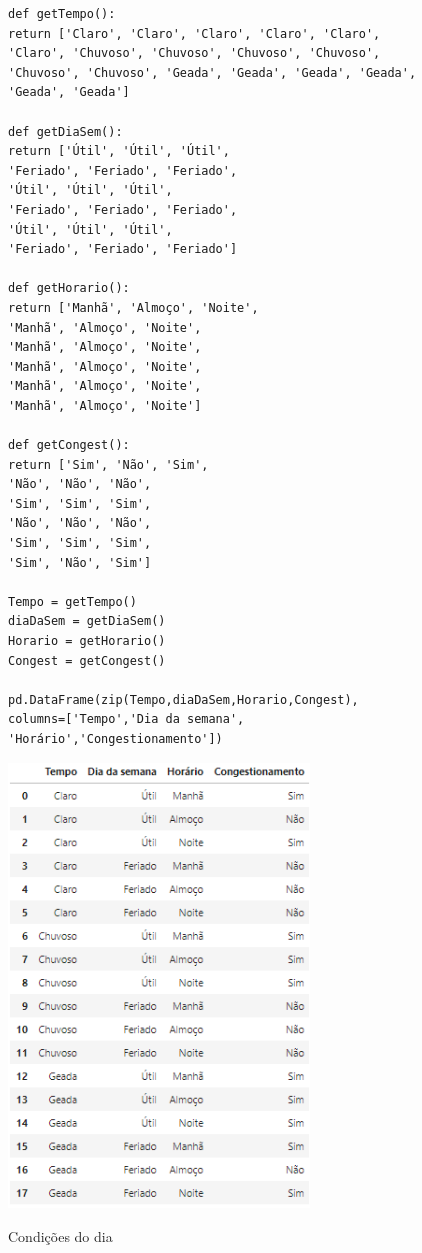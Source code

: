 \begin{verbatim}
def getTempo():
return ['Claro', 'Claro', 'Claro', 'Claro', 'Claro', 
'Claro', 'Chuvoso', 'Chuvoso', 'Chuvoso', 'Chuvoso', 
'Chuvoso', 'Chuvoso', 'Geada', 'Geada', 'Geada', 'Geada', 
'Geada', 'Geada']

def getDiaSem():
return ['Útil', 'Útil', 'Útil',
'Feriado', 'Feriado', 'Feriado',
'Útil', 'Útil', 'Útil',
'Feriado', 'Feriado', 'Feriado',
'Útil', 'Útil', 'Útil',
'Feriado', 'Feriado', 'Feriado']

def getHorario():
return ['Manhã', 'Almoço', 'Noite',
'Manhã', 'Almoço', 'Noite',
'Manhã', 'Almoço', 'Noite',
'Manhã', 'Almoço', 'Noite',
'Manhã', 'Almoço', 'Noite',
'Manhã', 'Almoço', 'Noite']

def getCongest():
return ['Sim', 'Não', 'Sim',
'Não', 'Não', 'Não',
'Sim', 'Sim', 'Sim',
'Não', 'Não', 'Não',
'Sim', 'Sim', 'Sim',
'Sim', 'Não', 'Sim']

Tempo = getTempo()
diaDaSem = getDiaSem()
Horario = getHorario()
Congest = getCongest()

pd.DataFrame(zip(Tempo,diaDaSem,Horario,Congest), 
columns=['Tempo','Dia da semana',
'Horário','Congestionamento'])
\end{verbatim}

\begin{table}[H]
	\centering
	\includegraphics[width=0.6\textwidth]{./Imagens/Teorema de Bayes/Tabela.png} 
	\caption{Condições do dia}
	\label{tab:Condições do dia}
\end{table}

